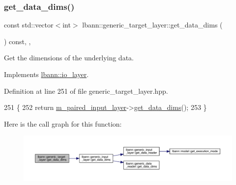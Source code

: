 \subsubsection{\texorpdfstring{get\+\_\+data\+\_\+dims()}{get\_data\_dims()}}
{\footnotesize\ttfamily const std\+::vector$<$int$>$ lbann\+::generic\+\_\+target\+\_\+layer\+::get\+\_\+data\+\_\+dims (\begin{DoxyParamCaption}{ }\end{DoxyParamCaption}) const\hspace{0.3cm}{\ttfamily [inline]}, {\ttfamily [override]}, {\ttfamily [virtual]}}

Get the dimensions of the underlying data. 

Implements \hyperlink{classlbann_1_1io__layer_a67feb9fd903ef4d2ca782bbe7860a413}{lbann\+::io\+\_\+layer}.



Definition at line 251 of file generic\+\_\+target\+\_\+layer.\+hpp.


\begin{DoxyCode}
251                                                       \{
252     \textcolor{keywordflow}{return} \hyperlink{classlbann_1_1generic__target__layer_a84da1260e9feb4fbc3e6f2315e4cab4b}{m\_paired\_input\_layer}->\hyperlink{classlbann_1_1generic__input__layer_a6008b13521d27d6139201fa374b088eb}{get\_data\_dims}();
253   \}
\end{DoxyCode}
Here is the call graph for this function\+:\nopagebreak
\begin{figure}[H]
\begin{center}
\leavevmode
\includegraphics[width=350pt]{classlbann_1_1generic__target__layer_abc0a5ec9761f3cebd34d3549d4681108_cgraph}
\end{center}
\end{figure}
\mbox{\label{classlbann_1_1generic__target__layer_af2a0f4313863a029263efd0fced40571}} 
